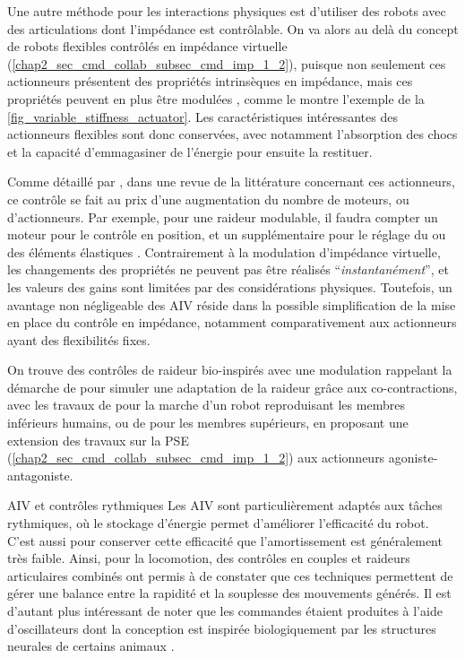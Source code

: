 Une autre méthode pour les interactions physiques est d'utiliser des robots avec des articulations dont l'impédance est contrôlable. On va alors au delà du concept de robots flexibles contrôlés en impédance virtuelle (\cref{chap2_sec_cmd_collab_subsec_cmd_imp_1_2}), puisque non seulement ces actionneurs présentent des propriétés intrinsèques en impédance, mais ces propriétés peuvent en plus être modulées \parencite{albu-schaffer_anthropomorphic_2011}, comme le montre l'exemple de la \cref{fig_variable_stiffness_actuator}. Les caractéristiques intéressantes des actionneurs flexibles sont donc conservées, avec notamment l'absorption des chocs et la capacité d'emmagasiner de l'énergie pour ensuite la restituer.

Comme détaillé par \textcite{vanderborght_variable_2013}, dans une revue de la littérature concernant ces actionneurs, ce contrôle se fait au prix d'une augmentation du nombre de moteurs, ou d'actionneurs. Par exemple, pour une raideur modulable, il faudra compter un moteur pour le contrôle en position, et un supplémentaire pour le réglage du ou des éléments élastiques \parencite{huang_torque-stiffness-controlled_2016}. Contrairement à la modulation d'impédance virtuelle, les changements des propriétés ne peuvent pas être réalisés \foreignquote{french}{\textit{instantanément}}, et les valeurs des gains sont limitées par des considérations physiques. Toutefois, un avantage non négligeable des AIV réside dans la possible simplification de la mise en place du contrôle en impédance, notamment comparativement aux actionneurs ayant des flexibilités fixes.

On trouve des contrôles de raideur bio-inspirés avec une modulation rappelant la démarche de \textcite{hogan_adaptive_1984} pour simuler une adaptation de la raideur grâce aux co-contractions, avec les travaux de \textcite{yamaguchi_realization_1998} pour la marche d'un robot reproduisant les membres inférieurs humains, ou de \textcite{mengacci_elastic_2021} pour les membres supérieurs, en proposant une extension des travaux sur la PSE (\cref{chap2_sec_cmd_collab_subsec_cmd_imp_1_2}) aux actionneurs agoniste-antagoniste.

\begin{aside}{AIV et contrôles rythmiques}
	Les AIV sont particulièrement adaptés aux tâches rythmiques, où le stockage d'énergie permet d'améliorer l'efficacité du robot. C'est aussi pour conserver cette efficacité que l'amortissement est généralement très faible. Ainsi, pour la locomotion, des contrôles en couples et raideurs articulaires combinés ont permis à \textcite{huang_torque-stiffness-controlled_2016} de constater que ces techniques permettent de gérer une balance entre la rapidité et la souplesse des mouvements générés. Il est d'autant plus intéressant de noter que les commandes étaient produites à l'aide d'oscillateurs dont la conception est inspirée biologiquement par les structures neurales de certains animaux \parencite{matsuoka_sustained_1985,ijspeert_central_2008,guertin_mammalian_2009}. 
\end{aside}

